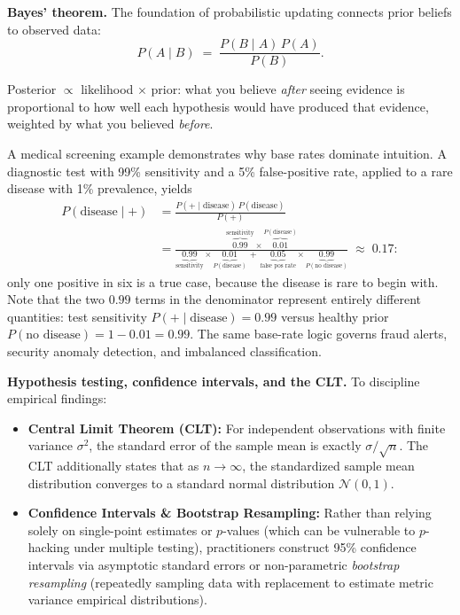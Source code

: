 \documentclass[11pt,a4paper]{article}
\begin{document}
	\textbf{Bayes' theorem.} The foundation of probabilistic updating connects prior beliefs to observed data:
	\begin{equation}
		P(A \mid B) \;=\; \frac{P(B \mid A)\,P(A)}{P(B)}.
		\label{eq:bayes}
	\end{equation}
	
	\begin{keyconcept}
		Posterior $\propto$ likelihood $\times$ prior: what you believe
		\emph{after} seeing evidence is proportional to how well each
		hypothesis would have produced that evidence, weighted by what you
		believed \emph{before}.
	\end{keyconcept}
	
	A medical screening example demonstrates why base rates dominate intuition. A diagnostic test with 99\% sensitivity and a 5\% false-positive rate, applied to a rare disease with 1\% prevalence, yields
	\begin{align}
		P(\text{disease}\mid +)
		&= \frac{P(+\mid\text{disease})\,P(\text{disease})}{P(+)}\\[2pt]
		&= \frac{\overbrace{0.99}^{\text{sensitivity}} \times \overbrace{0.01}^{P(\text{disease})}}{\underbrace{0.99}_{\text{sensitivity}} \times \underbrace{0.01}_{P(\text{disease})} \,+\, \underbrace{0.05}_{\text{false pos rate}} \times \underbrace{0.99}_{P(\text{no disease})}}
		\;\approx\; 0.17 :
	\end{align}
	only one positive in six is a true case, because the disease is rare to begin with. Note that the two $0.99$ terms in the denominator represent entirely different quantities: test sensitivity $P(+\mid\text{disease})=0.99$ versus healthy prior $P(\text{no disease})=1-0.01=0.99$. The same base-rate logic governs fraud alerts, security anomaly detection, and imbalanced classification.
	
	\textbf{Hypothesis testing, confidence intervals, and the CLT.} To discipline empirical findings:
	\begin{itemize}[nosep]
		\item \textbf{Central Limit Theorem (CLT):} For independent observations with finite variance $\sigma^2$, the standard error of the sample mean is exactly $\sigma/\sqrt{n}$. The CLT additionally states that as $n \to \infty$, the standardized sample mean distribution converges to a standard normal distribution $\mathcal{N}(0, 1)$.
		\item \textbf{Confidence Intervals \& Bootstrap Resampling:} Rather than relying solely on single-point estimates or $p$-values (which can be vulnerable to $p$-hacking under multiple testing), practitioners construct 95\% confidence intervals via asymptotic standard errors or non-parametric \emph{bootstrap resampling} (repeatedly sampling data with replacement to estimate metric variance empirical distributions).
	\end{itemize}
	
\end{document}
